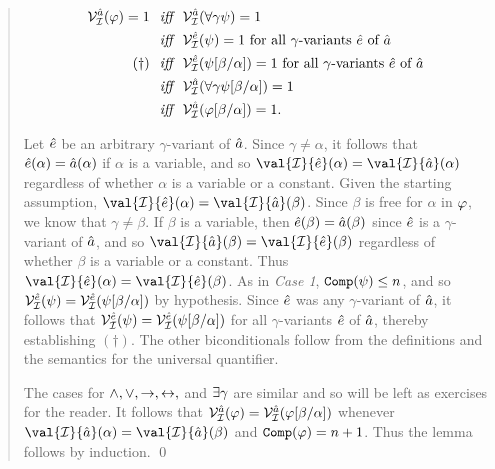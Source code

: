 \begin{quote}
  \vspace{-.2in}
  \begin{align*}
    \mathcal{V}_{\mathcal{I}}^{\hat{a}}(\varphi)=1 
      &\textit{ ~iff~ } \mathcal{V}_{\mathcal{I}}^{\hat{a}}(\forall \gamma\psi)=1\\
      &\textit{ ~iff~ } \mathcal{V}_{\mathcal{I}}^{\hat{e}}(\psi)=1 \text{ for all } \gamma\text{-variants } \hat{e} \text{ of } \hat{a}\\ 
      (\dagger) &\textit{ ~iff~ } \mathcal{V}_{\mathcal{I}}^{\hat{e}}(\psi[\beta/\alpha])=1 \text{ for all } \gamma\text{-variants } \hat{e} \text{ of } \hat{a}\\  
      &\textit{ ~iff~ } \mathcal{V}_{\mathcal{I}}^{\hat{a}}(\forall \gamma\psi[\beta/\alpha])=1\\ 
      &\textit{ ~iff~ } \mathcal{V}_{\mathcal{I}}^{\hat{a}}(\varphi[\beta/\alpha])=1.
  \end{align*}

  Let $\hat{e}$ be an arbitrary $\gamma$-variant of $\hat{a}$.
  Since $\gamma\neq\alpha$, it follows that $\hat{e}(\alpha)=\hat{a}(\alpha)$ if $\alpha$ is a variable, and so $\val{\I}{\va{e}}(\alpha)=\val{\I}{\va{a}}(\alpha)$ regardless of whether $\alpha$ is a variable or a constant.
  Given the starting assumption, $\val{\I}{\va{e}}(\alpha)=\val{\I}{\va{a}}(\beta)$.
  Since $\beta$ is free for $\alpha$ in $\varphi$, we know that $\gamma\neq\beta$.
  If $\beta$ is a variable, then $\hat{e}(\beta)=\hat{a}(\beta)$ since $\hat{e}$ is a $\gamma$-variant of $\hat{a}$, and so $\val{\I}{\va{a}}(\beta)=\val{\I}{\va{e}}(\beta)$ regardless of whether $\beta$ is a variable or a constant.
  Thus $\val{\I}{\va{e}}(\alpha)=\val{\I}{\va{e}}(\beta)$.
  As in \textit{Case 1}, $\texttt{Comp}(\psi)\leq n$, and so $\mathcal{V}_{\mathcal{I}}^{\hat{e}}(\psi)=\mathcal{V}_{\mathcal{I}}^{\hat{e}}(\psi[\beta/\alpha])$ by hypothesis.
  Since $\hat{e}$ was any $\gamma$-variant of $\hat{a}$, it follows that $\mathcal{V}_{\mathcal{I}}^{\hat{e}}(\psi)=\mathcal{V}_{\mathcal{I}}^{\hat{e}}(\psi[\beta/\alpha])$ for all $\gamma$-variants $\hat{e}$ of $\hat{a}$, thereby establishing $(\dagger)$.
  The other biconditionals follow from the definitions and the semantics for the universal quantifier.

  The cases for $\wedge,\vee,\rightarrow,\leftrightarrow,$ and $\exists \gamma$ are similar and so will be left as exercises for the reader.
  It follows that $\mathcal{V}_{\mathcal{I}}^{\hat{a}}(\varphi)=\mathcal{V}_{\mathcal{I}}^{\hat{a}}(\varphi[\beta/\alpha])$ whenever $\val{\I}{\va{a}}(\alpha)=\val{\I}{\va{a}}(\beta)$ and $\texttt{Comp}(\varphi)=n+1$.
  Thus the lemma follows by induction.
  \qed
\end{quote}


